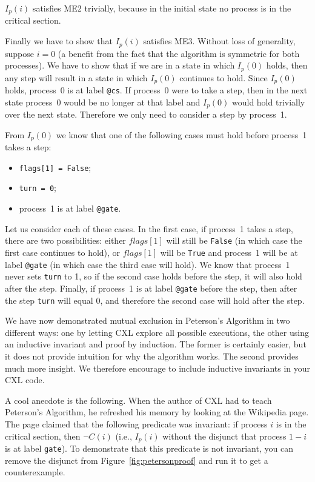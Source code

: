 \documentclass{report}
\begin{document}
$I_p(i)$ satisfies ME2 trivially, because in the initial state no process
is in the critical section.

Finally we have to show that $I_p(i)$ satisfies ME3. Without loss of
generality, suppose $i=0$ (a benefit from the fact that the algorithm is
symmetric for both processes).  We have to show that if we are in a state
in which $I_p(0)$ holds, then any step will result in a state in which
$I_p(0)$ continues to hold.
Since $I_p(0)$ holds, process~0 is at label \texttt{@cs}.  If process~0
were to take a step, then in the next state process~0 would be no longer
at that label and $I_p(0)$ would hold trivially over the next state.
Therefore we only need to consider a step by process~1.

From $I_p(0)$ we know that one of the following cases must hold before
process~1 takes a step:
\begin{itemize}
\item \texttt{flags[1] = False};
\item \texttt{turn = 0};
\item process~1 is at label \texttt{@gate}.
\end{itemize}

Let us consider each of these cases.
In the first case, if process~1 takes a step, there are two possibilities:
either $flags[1]$ will still be \texttt{False} (in which case the first case
continues to hold), or $flags[1]$ will be \texttt{True}
and process~1 will be at label \texttt{@gate} (in which case the third case
will hold).
We know that process~1 never sets \texttt{turn} to 1, so
if the second case holds before the step, it will also hold after the step.
Finally, if process~1 is at label \texttt{@gate} before the step, then after
the step \texttt{turn} will equal 0, and therefore the second case will hold
after the step.

We have now demonstrated mutual exclusion in Peterson's Algorithm in two
different ways: one by letting CXL explore all possible executions, the
other using an inductive invariant and proof by induction.  The former
is certainly easier, but it does not provide intuition for why the
algorithm works.  The second provides much more insight.  We therefore
encourage to include inductive invariants in your CXL code.

A cool anecdote is the following.  When the author of CXL had to teach
Peterson's Algorithm, he refreshed his memory by looking at the Wikipedia
page.  The page claimed that the following predicate was invariant:
if process $i$ is in the critical section, then $\lnot C(i)$ (i.e.,
$I_p(i)$ without the disjunct that process $1-i$ is at label \texttt{gate}).
To demonstrate that this predicate is not invariant, you can remove the
disjunct from Figure~\ref{fig:petersonproof} and run it to get a
counterexample.
\end{document}
